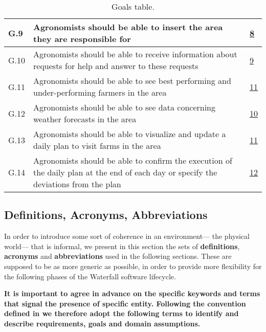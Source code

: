 \begin{table}[H]
\begin{tabular}{|l|m{}|l|}
        G.9                                  &   Agronomists should be able to insert the area they are responsible for   &   \hyperref[line:agronomistPrivileges]{8} \\
        \hline
        G.10                                                      &  Agronomists should be able to receive information about requests for help and answer to these requests   &    \hyperref[line:agronomistPrivileges]{9}\\%
        \hline
        G.11                                               &     Agronomists should be able to see best performing and under-performing farmers in the area &   \hyperref[line:agronomistPrivileges]{11} \\
        \hline
        G.12                                              &   Agronomists should be able to see data concerning weather forecasts in the area     &   \hyperref[line:agronomistPrivileges]{10} \\
        \hline
        G.13                                               &     Agronomists should be able to visualize and update a daily plan to visit farms in the area &   \hyperref[line:agronomistPrivileges]{11} \\
        \hline
        G.14                                              &   Agronomists should be able to confirm the execution of the daily plan at the end of each day or specify the deviations from the plan     &   \hyperref[line:agronomistPrivileges]{12} \\
        \hline
    \end{tabular}
    
    \caption{\label{tab:goals}Goals table.}
    
\end{table}

\subsection{Definitions, Acronyms, Abbreviations}
In order to introduce some sort of coherence in an environment--- the physical world--- that is informal, we present in this section the sets of \textbf{definitions}, \textbf{acronyms} and \textbf{abbreviations} used in the following sections. These are supposed to be as more generic as possible, in order to provide more flexibility for the following phases of the Waterfall software lifecycle.


\textbf{It is important to agree in advance on the specific keywords and terms that signal the presence of specific entity. Following the convention defined in \cite{iso_ieee_standard} we therefore adopt the following terms to identify and describe requirements, goals and domain assumptions.}

